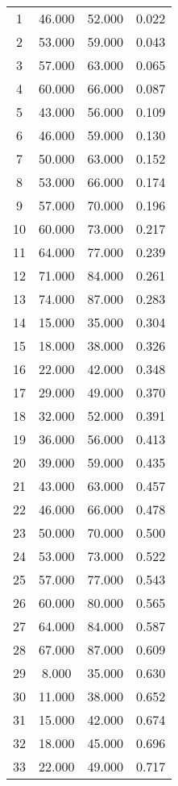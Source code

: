 % 
\begin{tabular}{cccc}
  \hline
  \hline
1 & 46.000 & 52.000 & 0.022 \\ 
  2 & 53.000 & 59.000 & 0.043 \\ 
  3 & 57.000 & 63.000 & 0.065 \\ 
  4 & 60.000 & 66.000 & 0.087 \\ 
  5 & 43.000 & 56.000 & 0.109 \\ 
  6 & 46.000 & 59.000 & 0.130 \\ 
  7 & 50.000 & 63.000 & 0.152 \\ 
  8 & 53.000 & 66.000 & 0.174 \\ 
  9 & 57.000 & 70.000 & 0.196 \\ 
  10 & 60.000 & 73.000 & 0.217 \\ 
  11 & 64.000 & 77.000 & 0.239 \\ 
  12 & 71.000 & 84.000 & 0.261 \\ 
  13 & 74.000 & 87.000 & 0.283 \\ 
  14 & 15.000 & 35.000 & 0.304 \\ 
  15 & 18.000 & 38.000 & 0.326 \\ 
  16 & 22.000 & 42.000 & 0.348 \\ 
  17 & 29.000 & 49.000 & 0.370 \\ 
  18 & 32.000 & 52.000 & 0.391 \\ 
  19 & 36.000 & 56.000 & 0.413 \\ 
  20 & 39.000 & 59.000 & 0.435 \\ 
  21 & 43.000 & 63.000 & 0.457 \\ 
  22 & 46.000 & 66.000 & 0.478 \\ 
  23 & 50.000 & 70.000 & 0.500 \\ 
  24 & 53.000 & 73.000 & 0.522 \\ 
  25 & 57.000 & 77.000 & 0.543 \\ 
  26 & 60.000 & 80.000 & 0.565 \\ 
  27 & 64.000 & 84.000 & 0.587 \\ 
  28 & 67.000 & 87.000 & 0.609 \\ 
  29 & 8.000 & 35.000 & 0.630 \\ 
  30 & 11.000 & 38.000 & 0.652 \\ 
  31 & 15.000 & 42.000 & 0.674 \\ 
  32 & 18.000 & 45.000 & 0.696 \\ 
  33 & 22.000 & 49.000 & 0.717 \\ 

\end{tabular}
